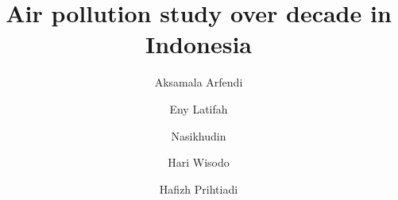 \documentclass[review,12pt]{elsarticle}
\begin{document}
\begin{frontmatter}



\title{Air pollution study over decade in Indonesia}

\author[label1]{Aksamala Arfendi}
\author[label1]{Eny Latifah}
\author[label1]{Nasikhudin}
\author[label1]{Hari Wisodo}
\author[label1]{Hafizh Prihtiadi}





\end{frontmatter}
\end{document}
